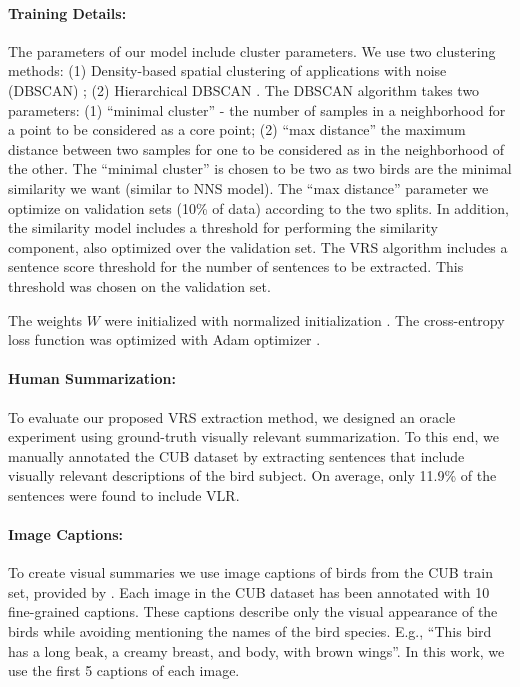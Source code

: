 \documentclass[11pt,a4paper]{article}
\newcommand\gal[1]{\textcolor{bright}{\textbf{GAL:} #1 }}
\newcommand\yuval[1]{\textcolor{darkpink}{\textbf{YUVAL:} #1 }}
\begin{document}
\paragraph{Training Details:}
The parameters of our model include cluster parameters. We use two clustering methods: (1) Density-based spatial clustering of applications with noise (DBSCAN) \citep{ester1996density}; (2) Hierarchical DBSCAN \citep{mcinnes2017hdbscan}. The DBSCAN algorithm takes two parameters: (1) \enquote{minimal cluster} - the number of samples in a neighborhood for a point to be considered as a core point; (2) \enquote{max distance} the maximum distance between two samples for one to be considered as in the neighborhood of the other. 
The \enquote{minimal cluster} is chosen to be two as two birds are the minimal similarity we want (similar to NNS model).
The \enquote{max distance} parameter we optimize on validation sets (10\% of data) according to the two splits. In addition, the similarity model includes a threshold for performing the similarity component, also optimized over the validation set. 
The VRS algorithm includes a sentence score threshold for the number of sentences to be extracted. This threshold was chosen on the validation set.



The weights   $W$ were initialized with normalized initialization \citep{glorot2010understanding}. The cross-entropy loss function was optimized with Adam optimizer \citep{Adam}.




\paragraph{Human Summarization:} 
To evaluate our proposed VRS extraction method, we designed an oracle experiment using ground-truth visually relevant summarization. To this end, we manually annotated the CUB dataset by extracting sentences that include visually relevant descriptions of the bird subject. On average, only 11.9\% of the sentences were found to include VLR. 

\paragraph{Image Captions:}
To create visual summaries we use image captions of birds from the CUB train set, provided by \citet{reed2016learning}. Each image in the CUB dataset has been annotated with 10 fine-grained captions. These captions describe only the visual appearance of the birds while avoiding mentioning the names of the bird species. E.g., \enquote{This bird has a long beak, a creamy breast, and body, with brown wings}. In this work, we use the first 5 captions of each image.
\end{document}
